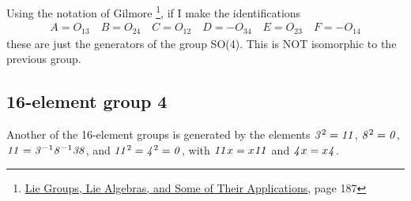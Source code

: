 \documentclass[12pt]{article}
\begin{document}
Using the notation of Gilmore \footnote{\underline{Lie Groups, Lie Algebras, 
and Some of Their Applications}, page 187},
if I make the identifications
\begin{eqnarray*}
A = O_{13} \quad B = O_{24} \quad C = O_{12} \quad D = -O_{34}
\quad E = O_{23} \quad F = -O_{14}
\end{eqnarray*}
these are just the generators of the group SO(4).
This is NOT isomorphic to the previous group.

\subsection{16-element group 4}


 Another of the 16-element groups is generated by the elements
${\bf \it 3}^2={\bf \it 1}{\bf \it 1}$,  ${\bf \it 8}^2={\bf \it 0}$, ${\bf \it 1}{\bf \it 1}={\bf \it 3}^{-1}{\bf \it 8}^{-1}{\bf \it 3}{\bf \it 8}$, and
${\bf \it 1}{\bf \it 1}^2={\bf \it 4}^2={\bf \it 0}$, with ${\bf \it 1}{\bf \it 1}x=x{\bf \it 1}{\bf \it 1}$ and ${\bf \it 4}x=x{\bf \it 4}$.
\end{document}
